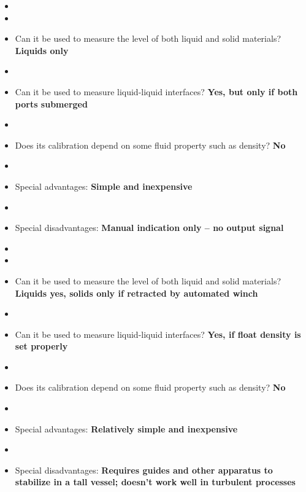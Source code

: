 \vskip 10pt
\begin{comment}
\underbar{\bf Nuclear}
\begin{itemize}
\item{} Can it be used to measure the level of both liquid and solid materials?
\item{} Can it be used to measure liquid-liquid interfaces?
\item{} Does its calibration depend on some fluid property such as density?
\item{} Special advantages:
\item{} Special disadvantages:
\end{itemize}
\end{comment}






\begin{itemize}
\goodbreak
\item{} 
\item\item{} Can it be used to measure the level of both liquid and solid materials? {\bf Liquids only}
\item\item{} Can it be used to measure liquid-liquid interfaces? {\bf Yes, but only if both ports submerged}
\item\item{} Does its calibration depend on some fluid property such as density? {\bf No}
\item\item{} Special advantages: {\bf Simple and inexpensive}
\item\item{} Special disadvantages: {\bf Manual indication only -- no output signal}
\end{itemize}

\vskip 10pt

\begin{itemize}
\goodbreak
\item{} 
\item\item{} Can it be used to measure the level of both liquid and solid materials? {\bf Liquids yes, solids only if retracted by automated winch}
\item\item{} Can it be used to measure liquid-liquid interfaces? {\bf Yes, if float density is set properly}
\item\item{} Does its calibration depend on some fluid property such as density? {\bf No}
\item\item{} Special advantages: {\bf Relatively simple and inexpensive}
\item\item{} Special disadvantages: {\bf Requires guides and other apparatus to stabilize in a tall vessel; doesn't work well in turbulent processes}
\end{itemize}

